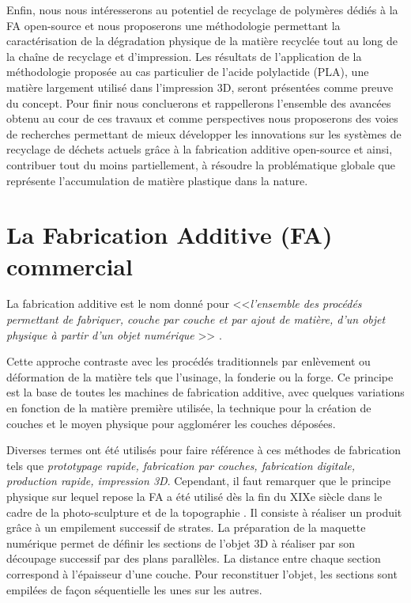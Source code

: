 Enfin, nous nous intéresserons au potentiel de recyclage de polymères dédiés à  la FA open-source et nous proposerons 
une méthodologie permettant la caractérisation de la dégradation physique de la matière recyclée tout au long de la chaîne de recyclage et d'impression.
Les résultats de l'application de la méthodologie proposée au cas particulier de l'acide polylactide (PLA), une matière largement utilisé dans l'impression 3D, seront présentées comme preuve du concept.
Pour finir nous concluerons et rappellerons l'ensemble des avancées obtenu au cour de ces travaux et comme perspectives nous proposerons des voies de recherches permettant de mieux développer les innovations sur les systèmes de recyclage de déchets actuels grâce à la fabrication additive open-source et ainsi, contribuer tout du moins partiellement, à résoudre la problématique globale que représente l'accumulation de matière plastique dans la nature.
%	

\section*{La Fabrication Additive (FA) commercial}

La fabrication additive  est le nom donné 	pour <<\textit{l'ensemble des procédés permettant de fabriquer, couche par couche et par ajout de matière, d'un objet physique à partir d’un objet numérique} >>
\parencite{Laverne2016, ASTM2012}.

Cette approche contraste avec les procédés traditionnels par enlèvement ou déformation de la matière tels que l'usinage, la fonderie ou la forge.
Ce principe est la base de toutes les machines de fabrication additive, avec quelques variations en fonction de la matière première utilisée,  la technique  pour la création de couches et le moyen physique pour  agglomérer les couches déposées.

Diverses termes ont été  utilisés pour faire référence à ces méthodes de fabrication tels que \textit{prototypage rapide, fabrication par couches, fabrication digitale, production rapide, impression 3D}. 
Cependant, il faut remarquer que le principe physique sur lequel repose la FA a été utilisé dès la fin du XIXe siècle dans le cadre de la photo-sculpture et de la topographie \parencite{Zhai2014, Bourell2009}.
Il consiste à réaliser un produit grâce à un empilement successif de strates. 
La préparation de la maquette numérique permet de définir les sections de l’objet 3D à réaliser par son découpage successif par des plans parallèles. 
La distance entre chaque section correspond à l’épaisseur d’une couche. 
Pour reconstituer l’objet, les sections sont empilées de façon séquentielle  les unes sur les autres.




